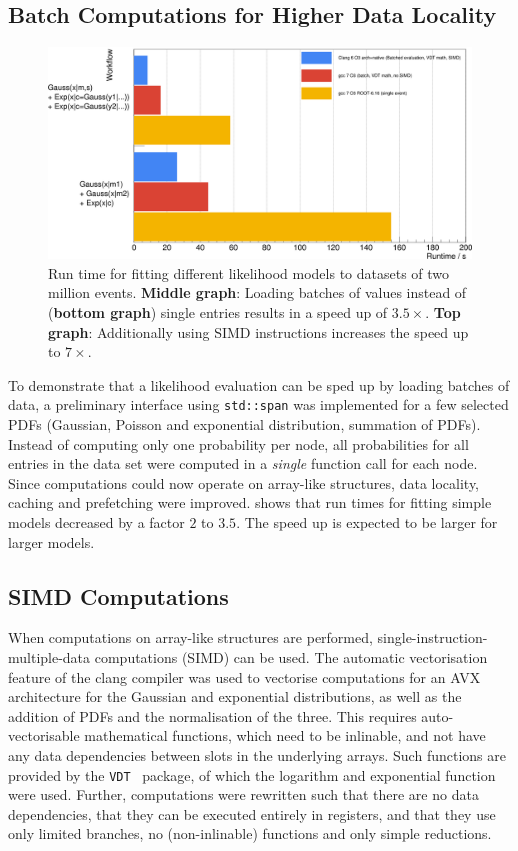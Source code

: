 \documentclass[a4paper]{jpconf}
\begin{document}
\subsection{Batch Computations for Higher Data Locality}
\begin{figure}[t]
\begin{center}
\includegraphics[width=1.\linewidth]{batchAndVecSpeed.png}
\end{center}
\caption{\label{VecSpeed}Run time for fitting different likelihood models to datasets of two million events. \textbf{Middle graph}: Loading
batches of values instead of (\textbf{bottom graph}) single entries results in a speed up of $3.5{\times}$.
\textbf{Top graph}: Additionally using SIMD instructions increases the speed up to $7{\times}$.}
\end{figure}

To demonstrate that a likelihood evaluation can be sped up by loading batches of data, a preliminary interface using \texttt{std::span} was
implemented for a few selected PDFs (Gaussian, Poisson and exponential distribution, summation of PDFs).
Instead of computing only one probability per node, all probabilities for all entries in the data set were
computed in a \textit{single} function call for each node. Since computations could now operate on array-like structures, data locality, caching and prefetching were improved.
 shows that run times for fitting simple models decreased by
a factor $2$ to $3.5$. The speed up is expected to be larger for larger models.

\subsection{SIMD Computations}
When computations on array-like structures are performed, single-instruction-multiple-data computations (SIMD) can be used. The automatic
vectorisation feature of the clang compiler was used to vectorise computations for an AVX architecture for the Gaussian and exponential distributions, as well as the
addition of PDFs and the normalisation of the three. This requires auto-vectorisable mathematical functions, which need to be inlinable, and
not have any data dependencies between slots in the underlying arrays. Such functions are provided by the
\texttt{VDT}~\cite{VDT} package, of which the logarithm and exponential function were used. Further, computations were rewritten such
that there are no data dependencies, that they can be executed entirely in registers,
and that they use only limited branches, no (non-inlinable) functions and only simple reductions.
\end{document}
